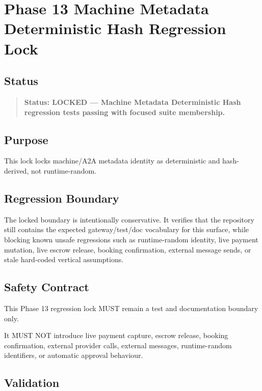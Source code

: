 \section{Phase 13 Machine Metadata Deterministic Hash Regression Lock}
\label{sec:phase13-machine-metadata-deterministic-hash-regression-lock}

\subsection{Status}

\begin{quote}
\textbf{Status: LOCKED --- Machine Metadata Deterministic Hash regression tests passing with focused suite membership.}
\end{quote}

\subsection{Purpose}

This lock locks machine/A2A metadata identity as deterministic and hash-derived, not runtime-random.

\subsection{Regression Boundary}

The locked boundary is intentionally conservative. It verifies that the repository still contains the expected gateway/test/doc vocabulary for this surface, while blocking known unsafe regressions such as runtime-random identity, live payment mutation, live escrow release, booking confirmation, external message sends, or stale hard-coded vertical assumptions.

\subsection{Safety Contract}

This Phase 13 regression lock MUST remain a test and documentation boundary only.

It MUST NOT introduce live payment capture, escrow release, booking confirmation, external provider calls, external messages, runtime-random identifiers, or automatic approval behaviour.

\subsection{Validation}

